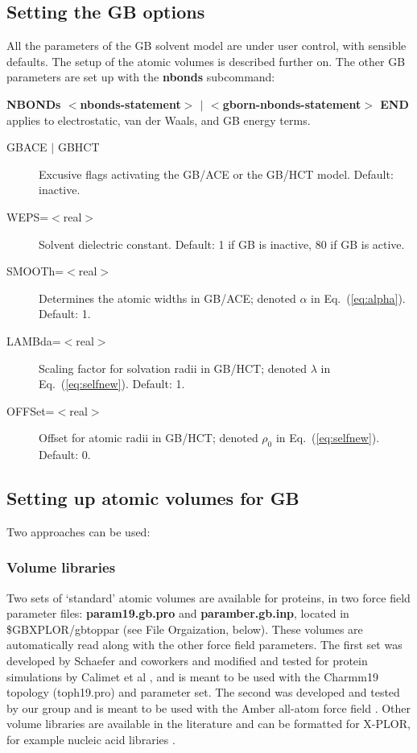 \documentclass[12pt]{report}
\begin{document}
\subsection{Setting the GB options}
All the parameters of the GB solvent model are under user control, with
sensible defaults. The setup of the atomic volumes is described further on.
The other GB parameters are set up with the {\bf nbonds} subcommand:
\begin{description}
\item {\bf NBONDs $<$nbonds-statement$>$ $|$ $<$gborn-nbonds-statement$>$ END} \\
applies to electrostatic, van der Waals, and GB energy terms.
\item[$<$gborn-nbonds-statement$>$ :==] \mbox{}
\begin{description}
\item [GBACE $|$ GBHCT] Excusive flags activating the GB/ACE or the GB/HCT model.
Default: inactive.
\item [WEPS=$<$real$>$] Solvent dielectric constant. Default: 1 if GB is inactive,
80 if GB is active. 
\item [SMOOTh=$<$real$>$] Determines the atomic widths in GB/ACE; denoted $\alpha$
in Eq.\ (\ref{eq:alpha}). Default: 1.
\item [LAMBda=$<$real$>$] Scaling factor for solvation radii in GB/HCT; denoted $\lambda$
in Eq.\ (\ref{eq:selfnew}). Default: 1.
\item [OFFSet=$<$real$>$] Offset for atomic radii in GB/HCT; denoted $\rho_0$
in Eq.\ (\ref{eq:selfnew}). Default: 0.
\end{description}
\end{description}

\subsection{Setting up atomic volumes for GB}
Two approaches can be used:

\subsubsection{Volume libraries}
Two sets of `standard' atomic volumes are available for proteins, in two force
field parameter files: {\bf param19.gb.pro} and {\bf paramber.gb.inp}, located
in \$GBXPLOR/gbtoppar (see File Orgaization, below). These volumes are automatically
read along with the other force field parameters. The first set was developed by
Schaefer and coworkers \cite{Schaefer01} and modified and tested for protein simulations
by Calimet et al \cite{Calimet01}, and is meant to be used with the Charmm19 topology
(toph19.pro) and parameter set. The second was developed and tested by our group
\cite{Lopes07} and is meant to be used with the Amber all-atom force field
\cite{Cornell95}. Other volume libraries are available in the literature and can
be formatted for X-PLOR, for example nucleic acid libraries \cite{Tsui00}. 
\end{document}
